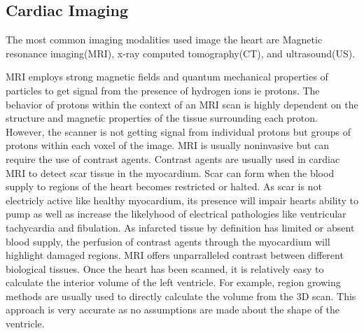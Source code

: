 \documentclass[12pt]{article}
\begin{document}
\subsection{Cardiac Imaging}

The most common imaging modalities used image the heart are Magnetic resonance imaging(MRI), x-ray computed tomography(CT), and ultrasound(US).

MRI employs strong magnetic fields and quantum mechanical properties of particles to get signal from the presence of hydrogen ions ie protons.
The behavior of protons within the context of an MRI scan is highly dependent on the structure and magnetic properties of the tissue surrounding each proton.
However, the scanner is not getting signal from individual protons but groups of protons within each voxel of the image.
MRI is usually noninvasive but can require the use of contrast agents.
Contrast agents are usually used in cardiac MRI to detect scar tissue in the myocardium.
Scar can form when the blood supply to regions of the heart becomes restricted or halted.
As scar is not electricly active like healthy myocardium, its presence will impair hearts ability to pump as well as increase the likelyhood of electrical pathologies like ventricular tachycardia and fibulation.
As infarcted tissue by definition has limited or absent blood supply, the perfusion of contrast agents through the myocardium will highlight damaged regions.
MRI offers unparralleled contrast between different biological tissues.
Once the heart has been scanned, it is relatively easy to calculate the interior volume of the left ventricle.
For example, region growing methods are usually used  to directly calculate the volume from the 3D scan.
This approach is very accurate as no assumptions are made about the shape of the ventricle.
\end{document}
